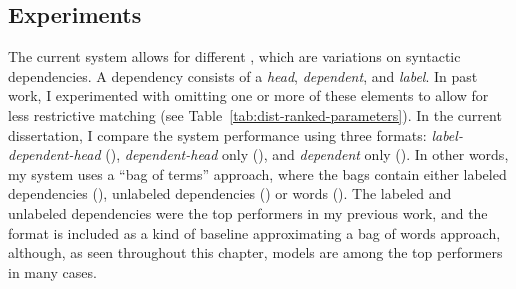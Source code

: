 \subsection{ Experiments}
\label{sec:exp-term-reps}
The current system allows for different , which are variations on syntactic dependencies. A dependency consists of a \textit{head}, \textit{dependent}, and \textit{label}. In past work, I experimented with omitting one or more of these elements to allow for less restrictive matching (see Table~\ref{tab:dist-ranked-parameters}). In the current dissertation, I compare the system performance using three formats: \textit{label-dependent-head} (), \textit{dependent-head} only (), and \textit{dependent} only (). In other words, my system uses a ``bag of terms'' approach, where the bags contain either labeled dependencies (), unlabeled dependencies () or words (). The labeled and unlabeled dependencies were the top performers in my previous work, and the  format is included as a kind of baseline approximating a bag of words approach, although, as seen throughout this chapter,  models are among the top performers in many cases.

